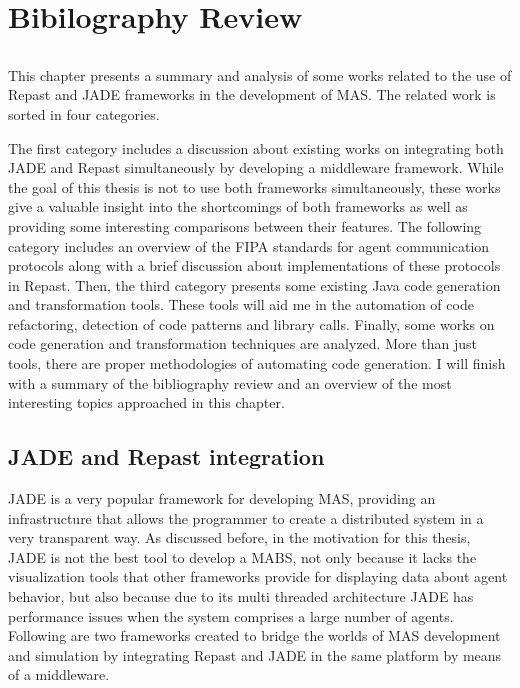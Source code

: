 \chapter{Bibilography Review} \label{chap:sota}

\section*{}



This chapter presents a summary and analysis of some works related to the use of Repast and JADE frameworks in the development of MAS. The related
work is sorted in four categories.

The first category includes a discussion about existing works on integrating both JADE and Repast simultaneously by developing a middleware framework.  While the goal of this thesis is not to use both frameworks simultaneously, these works give a valuable insight into the shortcomings of both frameworks as well as providing some interesting comparisons between their features.
The following category includes an overview of the FIPA standards for agent communication protocols along with a brief discussion about implementations of these protocols in Repast.
Then, the third category presents some existing Java code generation and transformation tools. These tools will aid me in the automation of code refactoring, detection of code patterns and library calls.
Finally, some works on code generation and transformation techniques are analyzed. More than just tools, there are proper methodologies of automating code generation. I will finish with a summary of the bibliography review and an overview of the most interesting topics approached in this chapter.

\section{JADE and Repast integration}
JADE is a very popular framework for developing MAS, providing an infrastructure that allows the programmer to create a distributed system in a very transparent way. As discussed before, in the motivation for this thesis, JADE is not the best tool to develop a MABS, not only because it lacks the visualization tools that other frameworks provide for displaying data about agent behavior, but also because due to its multi threaded architecture JADE has performance issues when the system comprises a large number of agents. Following are two frameworks created to bridge the worlds of MAS development and simulation by integrating Repast and JADE in the same platform by means of a middleware.

